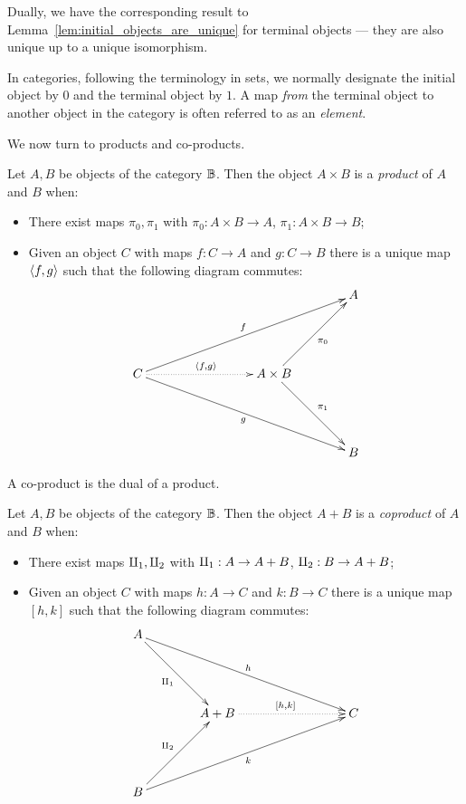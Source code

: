 Dually, we have the corresponding result to Lemma~\ref{lem:initial_objects_are_unique} for terminal
objects --- they are also unique up to a unique isomorphism.

In categories, following the terminology in sets, we normally designate the initial object by $0$
and the terminal object by $1$.
A map \emph{from} the terminal object to another object in the category is often referred to as an
\emph{element}.

We now turn to products and co-products.

\begin{definition}\label{def:categorical_product}
  Let $A,B$ be objects of the category $\mathbb{B}$. Then the object $A \times B$ is a \emph{product} of
  $A$ and $B$ when:
  \begin{itemize}
    \item There exist maps $\pi_0, \pi_1$ with $\pi_0:A\times B \to A$, $\pi_1:A\times B \to B$;
    \item Given an object $C$ with maps $f:C\to A$ and $g:C \to B$ there is a unique map
    $\langle f,g\rangle$ such that the following diagram commutes:
    \[
      \xymatrix@C+15pt@R+25pt{
        &&&A\\
        C\ar[urrr]^{f} \ar[drrr]_{g}\ar@{.>}[rr]^{\<f,g\>} & &A\times B \ar[ur]_{\pi_0}\ar[dr]^{\pi_1}\\
        &&&B
      }
    \]
  \end{itemize}

\end{definition}

A co-product is the dual of a product.

\begin{definition}\label{def:categorical_coproduct}
  Let $A,B$ be objects of the category $\mathbb{B}$. Then the object $A + B$ is a \emph{coproduct} of
  $A$ and $B$ when:
  \begin{itemize}
    \item There exist maps $\amalg_{1}, \amalg_{2}$ with $\amalg_{1}:A \to A + B$, $\amalg_{2}:B \to A+ B$;
    \item Given an object $C$ with maps $h:A\to C$ and $k:B \to C$ there is a unique map
    $[h,k]$ such that the following diagram commutes:
    \[
      \xymatrix@C+15pt@R+25pt{
        A \ar[drrr]^h \ar[dr]_{\cpa} \\
        &A +B \ar@{.>}[rr]^{[h,k]} && C\\
        B \ar[urrr]_k \ar[ur]^{\cpb}
      }
    \]
  \end{itemize}
\end{definition}

